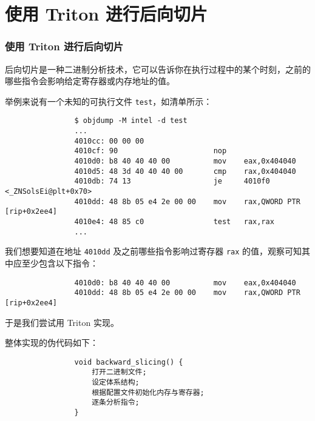 \documentclass{ctexbeamer}
\begin{document}
    \section{使用 Triton 进行后向切片}

    \begin{frame}[fragile]
        \frametitle{使用 Triton 进行后向切片}
    
        后向切片是一种二进制分析技术，它可以告诉你在执行过程中的某个时刻，之前的哪些指令会影响给定寄存器或内存地址的值。\pause

        举例来说有一个未知的可执行文件 \texttt{test}，如清单所示：

        {
            \scriptsize
            \begin{verbatim}
                $ objdump -M intel -d test
                ...
                4010cc:	00 00 00 
                4010cf:	90                   	nop
                4010d0:	b8 40 40 40 00       	mov    eax,0x404040
                4010d5:	48 3d 40 40 40 00    	cmp    rax,0x404040
                4010db:	74 13                	je     4010f0 <_ZNSolsEi@plt+0x70>
                4010dd:	48 8b 05 e4 2e 00 00 	mov    rax,QWORD PTR [rip+0x2ee4]
                4010e4:	48 85 c0             	test   rax,rax
                ...
            \end{verbatim}
        }
    
    \end{frame}

    \begin{frame}[fragile]

        我们想要知道在地址 \texttt{4010dd} 及之前哪些指令影响过寄存器 \texttt{rax} 的值，观察可知其中应至少包含以下指令：

        {
            \scriptsize
            \begin{verbatim}
                4010d0:	b8 40 40 40 00       	mov    eax,0x404040
                4010dd:	48 8b 05 e4 2e 00 00 	mov    rax,QWORD PTR [rip+0x2ee4]
            \end{verbatim}
        }

        于是我们尝试用 Triton 实现。\pause

        整体实现的伪代码如下：

        {
            \small
            \begin{verbatim}
                void backward_slicing() {
                    打开二进制文件;
                    设定体系结构;
                    根据配置文件初始化内存与寄存器;
                    逐条分析指令;
                }
            \end{verbatim}
        }
    
    \end{frame}
\end{document}
